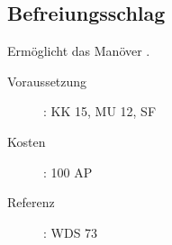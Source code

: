\subsection{Befreiungsschlag}
\label{sf.befreiungsschlag}
Ermöglicht das Manöver .
\begin{description}
    \item[Voraussetzung]:
        KK 15, MU 12, SF 
    \item [Kosten]:
        100 AP
    \item [Referenz]:
        WDS 73
\end{description}

